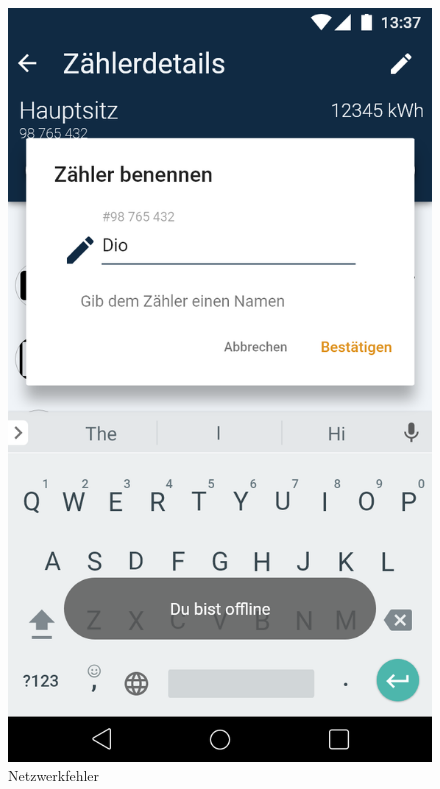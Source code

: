 \begin{figure}[h]
	\includegraphics[scale = 0.22]{img/AndroidMockup/rename}		
	\caption{Netzwerkfehler}
	\label{fig:mock-pw}
\end{figure}

